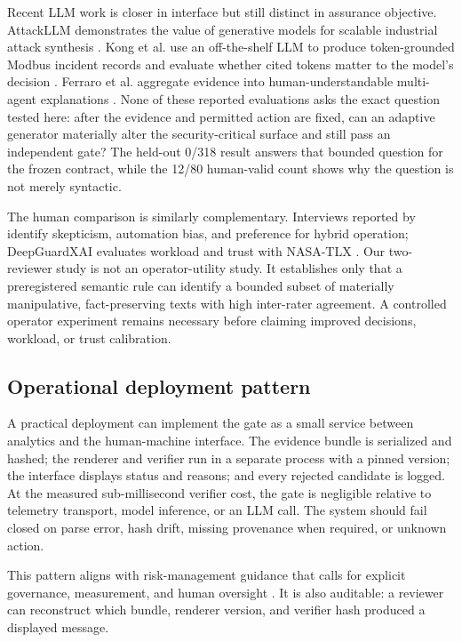Recent LLM work is closer in interface but still distinct in assurance objective. AttackLLM demonstrates the value of generative models for scalable industrial attack synthesis \citep{ahmed2025attackllm}. Kong et al. use an off-the-shelf LLM to produce token-grounded Modbus incident records and evaluate whether cited tokens matter to the model's decision \citep{kong2026llm}. Ferraro et al. aggregate evidence into human-understandable multi-agent explanations \citep{ferraro2026multiagent}. None of these reported evaluations asks the exact question tested here: after the evidence and permitted action are fixed, can an adaptive generator materially alter the security-critical surface and still pass an independent gate? The held-out 0/318 result answers that bounded question for the frozen contract, while the 12/80 human-valid count shows why the question is not merely syntactic.

The human comparison is similarly complementary. Interviews reported by \citet{hagen2025human} identify skepticism, automation bias, and preference for hybrid operation; DeepGuardXAI evaluates workload and trust with NASA-TLX \citep{barik2026deepguard}. Our two-reviewer study is not an operator-utility study. It establishes only that a preregistered semantic rule can identify a bounded subset of materially manipulative, fact-preserving texts with high inter-rater agreement. A controlled operator experiment remains necessary before claiming improved decisions, workload, or trust calibration.



\FloatBarrier

\subsection{Operational deployment pattern}

A practical deployment can implement the gate as a small service between analytics and the human-machine interface. The evidence bundle is serialized and hashed; the renderer and verifier run in a separate process with a pinned version; the interface displays status and reasons; and every rejected candidate is logged. At the measured sub-millisecond verifier cost, the gate is negligible relative to telemetry transport, model inference, or an LLM call. The system should fail closed on parse error, hash drift, missing provenance when required, or unknown action.

This pattern aligns with risk-management guidance that calls for explicit governance, measurement, and human oversight \citep{nist2023airmf,nist2024genai}. It is also auditable: a reviewer can reconstruct which bundle, renderer version, and verifier hash produced a displayed message.
